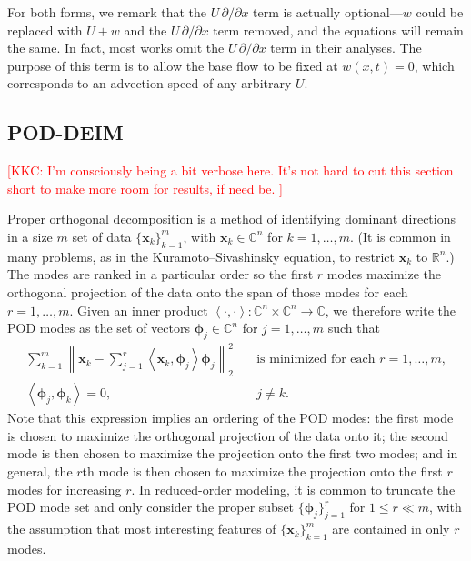 \documentclass[11pt]{article}
\newcommand*{\Complex}{\mathbb{C}}
\newcommand*{\Reals}{\mathbb{R}}
\newcommand*{\ip}[2]{\left<#1, #2\right>}
\newcommand*{\x}{\mathbf{x}}
\newcommand*{\phiv}{\bm{\phi}}
\newcommand{\KSE}{Kuramoto--Sivashinsky equation}
\newcommand{\kkc}[1]{\textcolor{red}{[KKC: #1]}}
\begin{document}
For both forms, we remark that the $U \, \partial / \partial x$ term is actually optional---$w$ could be replaced with $U + w$ and the $U \, \partial / \partial x$ term removed, and the equations will remain the same.
In fact, most works omit the $U \, \partial / \partial x$ term in their analyses.
The purpose of this term is to allow the base flow to be fixed at $w(x, t) = 0$, which corresponds to an advection speed of any arbitrary $U$.

\subsection{POD-DEIM}

\kkc{%
    I'm consciously being a bit verbose here.
    It's not hard to cut this section short to make more room for results, if need be.%
}

Proper orthogonal decomposition \citep{SirovichQAM87, HolmesTCSDSS} is a method of identifying dominant directions in a size $m$ set of data $\{\x_k\}_{k=1}^m$, with $\x_k \in \Complex^n$ for $k = 1, \ldots, m$.
(It is common in many problems, as in the \KSE, to restrict $\x_k$ to $\Reals^n$.)
The modes are ranked in a particular order so the first $r$ modes maximize the orthogonal projection of the data onto the span of those modes for each $r = 1, \ldots, m$.
Given an inner product $\ip{\cdot}{\cdot} : \Complex^n \times \Complex^n \to \Complex$, we therefore write the POD modes as the set of vectors $\phiv_j \in \Complex^n$ for $j = 1, \ldots, m$ such that
\begin{subequations}
    \begin{align}
        \sum_{k=1}^m \left\|\x_k - \sum_{j=1}^r \ip{\x_k}{\phiv_j} \phiv_j \right\|_2^2 \quad & \text{is minimized for each } r = 1, \ldots, m, \\
        \ip{\phiv_j}{\phiv_k} = 0, \quad & j \ne k.
    \end{align}
\end{subequations}
Note that this expression implies an ordering of the POD modes: the first mode is chosen to maximize the orthogonal projection of the data onto it; the second mode is then chosen to maximize the projection onto the first two modes; and in general, the $r$th mode is then chosen to maximize the projection onto the first $r$ modes for increasing $r$.
In reduced-order modeling, it is common to truncate the POD mode set and only consider the proper subset $\{\phiv_j\}_{j=1}^r$ for $1 \le r \ll m$, with the assumption that most interesting features of $\{\x_k\}_{k=1}^m$ are contained in only $r$ modes.
\end{document}

